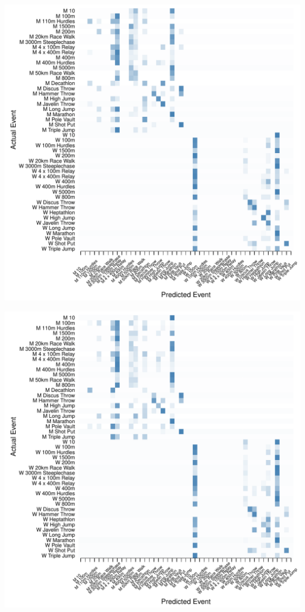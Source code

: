 \documentclass[landscape, paperwidth=42in, paperheight=36in,
fontscale=.35, margin=1in]{baposter}
\begin{document}
\begin{poster}
{    %
\begin{center}
  \begin{minipage}{0.45\textwidth}
    \begin{center}
      \includegraphics[scale=0.27]{../graphics/athletesCIT-trn.pdf}
    \end{center}
  \end{minipage}
  \hspace{0.05\textwidth}
  \begin{minipage}{0.45\textwidth}
    \begin{center}
      \includegraphics[scale=0.27]{../graphics/athletesCIT-tst.pdf}

\end{center}
\end{minipage}
\end{center}}
\end{poster}
\end{document}
